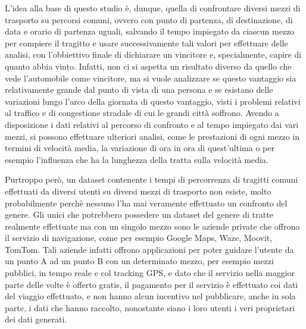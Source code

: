L'idea alla base di questo studio è, dunque, quella di confrontare diversi mezzi di trasporto su percorsi comuni, ovvero con punto di partenza, di destinazione, di data e orario di partenza uguali, salvando il tempo impiegato da ciascun mezzo per compiere il tragitto e usare successivamente tali valori per effettuare delle analisi, con l'obbiettivo finale di dichiarare un vincitore e, specialmente, capire di quanto abbia vinto. Infatti, non ci si aspetta un risultato diverso da quello che vede l'automobile come vincitore, ma si vuole analizzare se questo vantaggio sia relativamente grande dal punto di vista di una persona e se esistano delle variazioni lungo l'arco della giornata di questo vantaggio, visti i problemi relativi al traffico e di congestione stradale di cui le grandi città soffrono. Avendo a disposizione i dati relativi al percorso di confronto e al tempo impiegato dai vari mezzi, si possono effettuare ulteriori analisi, come le prestazioni di ogni mezzo in termini di velocità media, la variazione di ora in ora di quest'ultima o per esempio l'influenza che ha la lunghezza della tratta sulla velocità media.

Purtroppo però, un dataset contenente i tempi di percorrenza di tragitti comuni effettuati da diversi utenti su diversi mezzi di trasporto non esiste, molto probabilmente perchè nessuno l'ha mai veramente effettuato un confronto del genere. Gli unici che potrebbero possedere un dataset del genere di tratte realmente effettuate ma con un singolo mezzo sono le aziende private che offrono il servizio di navigazione, come per esempio Google Maps, Waze, Moovit, TomTom. Tali aziende infatti offrono applicazioni per poter guidare l'utente da un punto A ad un punto B con un determinato mezzo, per esempio mezzi pubblici, in tempo reale e col tracking GPS, e dato che il servizio nella maggior parte delle volte è offerto gratis, il pagamento per il servizio è effettuato coi dati del viaggio effettuato, e non hanno alcun incentivo nel pubblicare, anche in sola parte, i dati che hanno raccolto, nonostante siano i loro utenti i veri proprietari dei dati generati.

